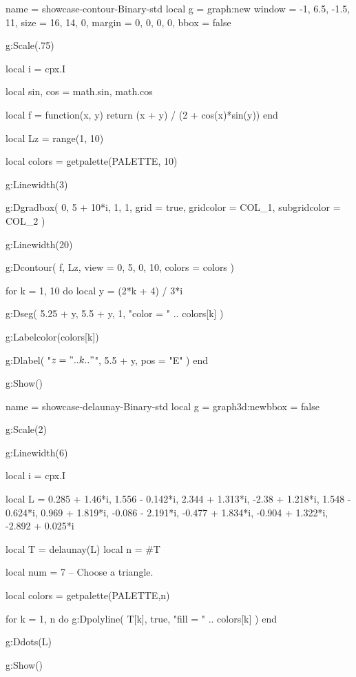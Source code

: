 \documentclass{tutodoc}
\newcommand{\PALETTE}{Binary}
\begin{document}

\newpage

\begin{luadraw}{name = showcase-contour-\PALETTE-std}
local g = graph:new{
  window = {-1, 6.5, -1.5, 11},
  size   = {16, 14, 0},
  margin = {0, 0, 0, 0},
  bbox   = false
}

g:Scale(.75)

local i = cpx.I

local sin, cos = math.sin, math.cos

local f = function(x, y)
  return (x  +  y) / (2  +  cos(x)*sin(y))
end

local Lz = range(1, 10)

local colors = getpalette(PALETTE, 10)

g:Linewidth(3)

g:Dgradbox(
  {0, 5  +  10*i, 1, 1},
  {
    grid         = true,
    gridcolor    = COL_1,
    subgridcolor = COL_2
  }
)

g:Linewidth(20)

g:Dcontour(
  f,
  Lz,
  {
    view   = {0, 5, 0, 10},
    colors = colors
  }
)

for k = 1, 10 do
  local y = (2*k  +  4) / 3*i

  g:Dseg(
    {5.25  +  y, 5.5  +  y},
    1,
    "color = " .. colors[k]
  )

  g:Labelcolor(colors[k])

  g:Dlabel(
    "$z = " .. k .. "$",
    5.5  +  y,
    {pos = "E"}
  )
end

g:Show()
\end{luadraw}



\vfill

\begin{luadraw}{name = showcase-delaunay-\PALETTE-std}
local g = graph3d:new{bbox = false}

g:Scale(2)

g:Linewidth(6)

local i = cpx.I

local L = {
   0.285 + 1.46*i,
   1.556 - 0.142*i,
   2.344 + 1.313*i,
  -2.38  + 1.218*i,
   1.548 - 0.624*i,
   0.969 + 1.819*i,
  -0.086 - 2.191*i,
  -0.477 + 1.834*i,
  -0.904 + 1.322*i,
  -2.892 + 0.025*i
} 

local T = delaunay(L)
local n = #T

local num = 7 -- Choose a triangle.

local colors = getpalette(PALETTE,n) 

for k = 1, n do
  g:Dpolyline(
    T[k],
    true,
    "fill = " .. colors[k]
  ) 
end

g:Ddots(L)

g:Show()
\end{luadraw}
\end{document}
